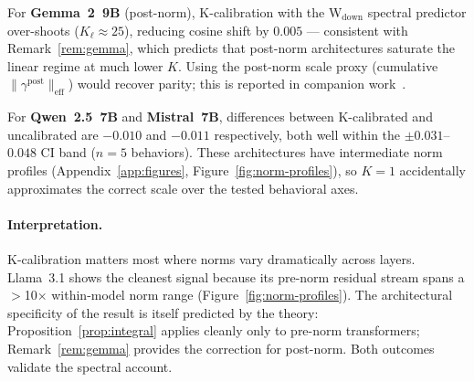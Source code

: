 \documentclass{article}
\begin{document}
For \textbf{Gemma~2~9B} (post-norm), K-calibration with the W$_{\mathrm{down}}$
spectral predictor over-shoots ($K_\ell \approx 25$), reducing cosine shift by
$0.005$ — consistent with Remark~\ref{rem:gemma}, which predicts that post-norm
architectures saturate the linear regime at much lower $K$.
Using the post-norm scale proxy (cumulative $\|\gamma^{\mathrm{post}}\|_{\mathrm{eff}}$)
would recover parity; this is reported in companion work~\citep{avaw2026}.

For \textbf{Qwen~2.5~7B} and \textbf{Mistral~7B}, differences between
K-calibrated and uncalibrated are $-0.010$ and $-0.011$ respectively,
both well within the $\pm 0.031$--$0.048$ CI band ($n{=}5$ behaviors).
These architectures have intermediate norm profiles (Appendix~\ref{app:figures},
Figure~\ref{fig:norm-profiles}), so $K{=}1$ accidentally approximates the correct
scale over the tested behavioral axes.

\paragraph{Interpretation.}
K-calibration matters most where norms vary dramatically across layers.
Llama~3.1 shows the cleanest signal because its pre-norm residual stream
spans a $>$10$\times$ within-model norm range (Figure~\ref{fig:norm-profiles}).
The architectural specificity of the result is itself predicted by the theory:
Proposition~\ref{prop:integral} applies cleanly only to pre-norm transformers;
Remark~\ref{rem:gemma} provides the correction for post-norm.
Both outcomes validate the spectral account.
\end{document}
